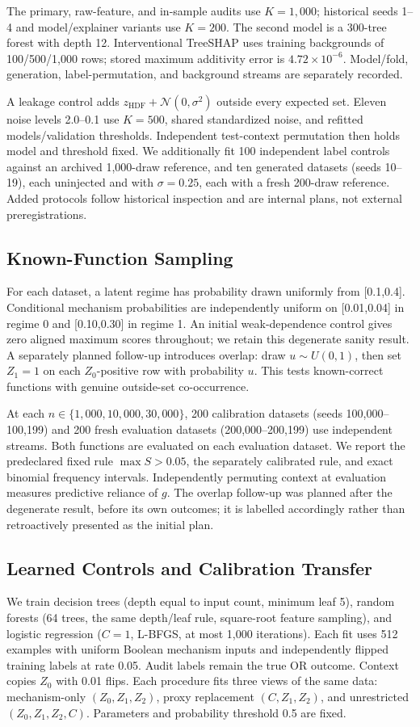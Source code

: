 \documentclass[conference]{IEEEtran}
\begin{document}
The primary, raw-feature, and in-sample audits use $K=1{,}000$; historical seeds 1--4 and model/explainer variants use $K=200$. The second model is a 300-tree forest with depth 12. Interventional TreeSHAP uses training backgrounds of 100/500/1{,}000 rows; stored maximum additivity error is $4.72\times10^{-6}$. Model/fold, generation, label-permutation, and background streams are separately recorded.

A leakage control adds $z_{\mathrm{HDF}}+\mathcal N(0,\sigma^2)$ outside every expected set. Eleven noise levels 2.0--0.1 use $K=500$, shared standardized noise, and refitted models/validation thresholds. Independent test-context permutation then holds model and threshold fixed. We additionally fit 100 independent label controls against an archived 1{,}000-draw reference, and ten generated datasets (seeds 10--19), each uninjected and with $\sigma=0.25$, each with a fresh 200-draw reference. Added protocols follow historical inspection and are internal plans, not external preregistrations.

\subsection{Known-Function Sampling}
For each dataset, a latent regime has probability drawn uniformly from [0.1,0.4]. Conditional mechanism probabilities are independently uniform on [0.01,0.04] in regime 0 and [0.10,0.30] in regime 1. An initial weak-dependence control gives zero aligned maximum scores throughout; we retain this degenerate sanity result. A separately planned follow-up introduces overlap: draw $u\sim U(0,1)$, then set $Z_1=1$ on each $Z_0$-positive row with probability $u$. This tests known-correct functions with genuine outside-set co-occurrence.

At each $n\in\{1{,}000,10{,}000,30{,}000\}$, 200 calibration datasets (seeds 100{,}000--100{,}199) and 200 fresh evaluation datasets (200{,}000--200{,}199) use independent streams. Both functions are evaluated on each evaluation dataset. We report the predeclared fixed rule $\max S>0.05$, the separately calibrated rule, and exact binomial frequency intervals. Independently permuting context at evaluation measures predictive reliance of $g$. The overlap follow-up was planned after the degenerate result, before its own outcomes; it is labelled accordingly rather than retroactively presented as the initial plan.

\subsection{Learned Controls and Calibration Transfer}
We train decision trees (depth equal to input count, minimum leaf 5), random forests (64 trees, the same depth/leaf rule, square-root feature sampling), and logistic regression ($C=1$, L-BFGS, at most 1{,}000 iterations). Each fit uses 512 examples with uniform Boolean mechanism inputs and independently flipped training labels at rate 0.05. Audit labels remain the true OR outcome. Context copies $Z_0$ with 0.01 flips. Each procedure fits three views of the same data: mechanism-only $(Z_0,Z_1,Z_2)$, proxy replacement $(C,Z_1,Z_2)$, and unrestricted $(Z_0,Z_1,Z_2,C)$. Parameters and probability threshold 0.5 are fixed.
\end{document}

